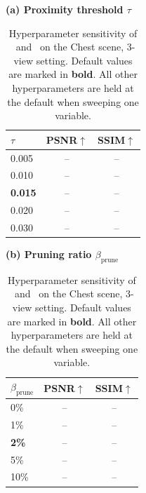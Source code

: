 \begin{table}[t]
\centering
\caption{Hyperparameter sensitivity of \gap\ and \adm\ on the Chest scene, 3-view setting. Default values are marked in \textbf{bold}. All other hyperparameters are held at the default when sweeping one variable.}
\label{tab:hparam_gap}
\setlength{\tabcolsep}{4pt}

\begin{minipage}[t]{0.48\linewidth}
\centering
\vspace{0pt}
\scriptsize
\textbf{(a) Proximity threshold $\tau$}\\[3pt]
\begin{tabular}{@{}lcc@{}}
\toprule
$\tau$ & PSNR$\uparrow$ & SSIM$\uparrow$ \\
\midrule
0.005 & -- & -- \\
0.010 & -- & -- \\
\textbf{0.015} & -- & -- \\
0.020 & -- & -- \\
0.030 & -- & -- \\
\bottomrule
\end{tabular}
\end{minipage}%
\hfill%
\begin{minipage}[t]{0.48\linewidth}
\centering
\vspace{0pt}
\scriptsize
\textbf{(b) Pruning ratio $\beta_{\text{prune}}$}\\[3pt]
\begin{tabular}{@{}lcc@{}}
\toprule
$\beta_{\text{prune}}$ & PSNR$\uparrow$ & SSIM$\uparrow$ \\
\midrule
0\% & -- & -- \\
1\% & -- & -- \\
\textbf{2\%} & -- & -- \\
5\% & -- & -- \\
10\% & -- & -- \\
\bottomrule
\end{tabular}
\end{minipage}

\vspace{6pt}


\end{table}
